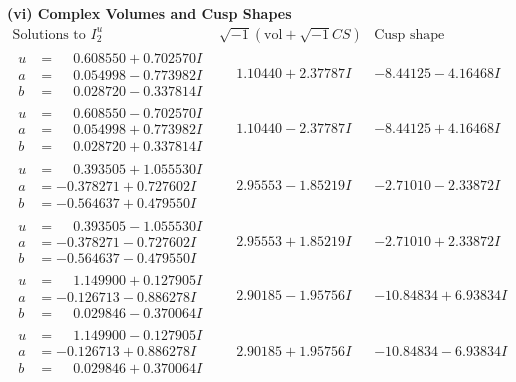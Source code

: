 \documentclass[1p]{elsarticle_modified}
\theoremstyle{definition}
\newcommand{\I}{\sqrt{-1}}
\begin{document}
\newpage\flushleft \textbf{(vi) Complex Volumes and Cusp Shapes}
$$\begin{array}{c|c|c}  
\text{Solutions to }I^u_{2}& \I (\text{vol} + \sqrt{-1}CS) & \text{Cusp shape}\\
 \hline 
\begin{aligned}
u &= \phantom{-}0.608550 + 0.702570 I \\
a &= \phantom{-}0.054998 - 0.773982 I \\
b &= \phantom{-}0.028720 - 0.337814 I\end{aligned}
 & \phantom{-}1.10440 + 2.37787 I & -8.44125 - 4.16468 I \\ \hline\begin{aligned}
u &= \phantom{-}0.608550 - 0.702570 I \\
a &= \phantom{-}0.054998 + 0.773982 I \\
b &= \phantom{-}0.028720 + 0.337814 I\end{aligned}
 & \phantom{-}1.10440 - 2.37787 I & -8.44125 + 4.16468 I \\ \hline\begin{aligned}
u &= \phantom{-}0.393505 + 1.055530 I \\
a &= -0.378271 + 0.727602 I \\
b &= -0.564637 + 0.479550 I\end{aligned}
 & \phantom{-}2.95553 - 1.85219 I & -2.71010 - 2.33872 I \\ \hline\begin{aligned}
u &= \phantom{-}0.393505 - 1.055530 I \\
a &= -0.378271 - 0.727602 I \\
b &= -0.564637 - 0.479550 I\end{aligned}
 & \phantom{-}2.95553 + 1.85219 I & -2.71010 + 2.33872 I \\ \hline\begin{aligned}
u &= \phantom{-}1.149900 + 0.127905 I \\
a &= -0.126713 - 0.886278 I \\
b &= \phantom{-}0.029846 - 0.370064 I\end{aligned}
 & \phantom{-}2.90185 - 1.95756 I & -10.84834 + 6.93834 I \\ \hline\begin{aligned}
u &= \phantom{-}1.149900 - 0.127905 I \\
a &= -0.126713 + 0.886278 I \\
b &= \phantom{-}0.029846 + 0.370064 I\end{aligned}
 & \phantom{-}2.90185 + 1.95756 I & -10.84834 - 6.93834 I \\ \hline\begin{aligned}

\end{aligned}
\end{array}$$
\end{document}
